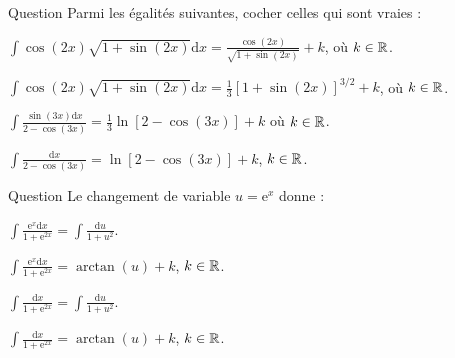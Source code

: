 \begin{multi}[multiple,feedback=
{Avec \(u=1+\sin (2x)\), on aura \(\displaystyle \mathrm{d}u=2\cos (2x)\mathrm{d}x\). D'où
\[\int \cos (2x)\sqrt{1+\sin (2x)}\mathrm{d}x=2\int \sqrt{u}\mathrm{d}u=\frac{1}{3}u^{3/2}+k,\; k\in \Rr.\]
De même, avec \(u=2-\cos (3x)\), on aura \(\displaystyle \mathrm{d}u=3\sin(3x)\mathrm{d}x\). D'où
\[\int \frac{\sin (3x)\mathrm{d}x}{2-\cos (3x)}=\frac{1}{3}\int \frac{\mathrm{d}u}{u}=\frac{1}{3}\ln |u|+k,\; k\in \Rr.\]
}]{Question}
Parmi les égalités suivantes, cocher celles qui sont vraies :

    \item \(\displaystyle \int \cos (2x)\sqrt{1+\sin (2x)}\mathrm{d}x=\frac{\cos (2x)}{\sqrt{1+\sin (2x)}}+k\), où \(k\in \mathbb{R}\).
    \item* \(\displaystyle \int \cos (2x)\sqrt{1+\sin (2x)}\mathrm{d}x=\frac{1}{3}\left[1+\sin (2x)\right]^{3/2}+k\), où \(k\in \mathbb{R}\).
    \item* \(\displaystyle \int \frac{\sin (3x)\mathrm{d}x}{2-\cos (3x)}=\frac{1}{3}\ln \left[2-\cos (3x)\right]+k\) où \(k\in \mathbb{R}\).
    \item \(\displaystyle \int \frac{\mathrm{d}x}{2-\cos (3x)}=\ln \left[2-\cos (3x)\right]+k\), \(k\in \mathbb{R}\).
\end{multi}


\begin{multi}[multiple,feedback=
{Avec \(u=\mathrm{e}^x\), on aura : \(\mathrm{d}u=\mathrm{e}^x\mathrm{d}x\). D'où
\[\displaystyle \int \frac{\mathrm{e}^x\mathrm{d}x}{1+\mathrm{e}^{2x}}=\int \frac{\mathrm{d}u}{1+u^2}=\arctan(u)+k,\; k\in \Rr.\]
}]{Question}
Le changement de variable \(u=\mathrm{e}^x\) donne :

    \item* \(\displaystyle \int \frac{\mathrm{e}^x\mathrm{d}x}{1+\mathrm{e}^{2x}}=\int \frac{\mathrm{d}u}{1+u^2}\).
    \item* \(\displaystyle \int \frac{\mathrm{e}^x\mathrm{d}x}{1+\mathrm{e}^{2x}}=\arctan(u)+k\), \(k\in \mathbb{R}\).
    \item \(\displaystyle \int \frac{\mathrm{d}x}{1+\mathrm{e}^{2x}}=\int \frac{\mathrm{d}u}{1+u^2}\).
    \item \(\displaystyle \int \frac{\mathrm{d}x}{1+\mathrm{e}^{2x}}=\arctan(u)+k\), \(k\in \mathbb{R}\).
\end{multi}


